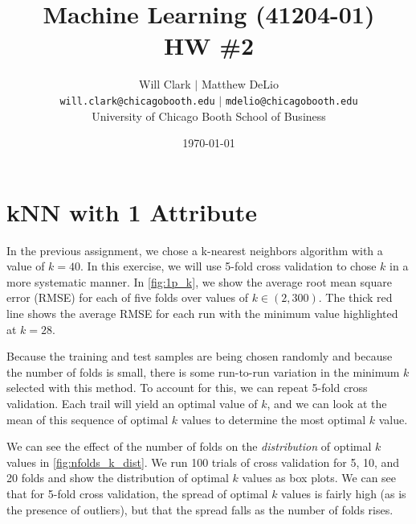 \documentclass[11pt, fleqn]{article}
\begin{document}
\title{Machine Learning (41204-01)\\HW \#2}
\author{Will Clark $\vert$ Matthew DeLio \\
\texttt{will.clark@chicagobooth.edu} $\vert$ \texttt{mdelio@chicagobooth.edu} \\
University of Chicago Booth School of Business}
\date{\today}
\maketitle

\section{kNN with 1 Attribute}

In the previous assignment, we chose a k-nearest neighbors algorithm with a value of $k=40$. In this exercise, we will use 5-fold cross validation to chose $k$ in a more systematic manner. In \cref{fig:1p_k}, we show the average root mean square error (RMSE) for each of five folds over values of $k \in (2,300)$. The thick red line shows the average RMSE for each run with the minimum value highlighted at $k=28$. 

Because the training and test samples are being chosen randomly and because the number of folds is small, there is some run-to-run variation in the minimum $k$ selected with this method. To account for this, we can repeat 5-fold cross validation. Each trail will yield an optimal value of $k$, and we can look at the mean of this sequence of optimal $k$ values to determine the most optimal $k$ value.

We can see the effect of the number of folds on the \textit{distribution} of optimal $k$ values in \cref{fig:nfolds_k_dist}. We run 100 trials of cross validation for 5, 10, and 20 folds and show the distribution of optimal $k$ values as box plots. We can see that for 5-fold cross validation, the spread of optimal $k$ values is fairly high (as is the presence of outliers), but that the spread falls as the number of folds rises. 
\end{document}
